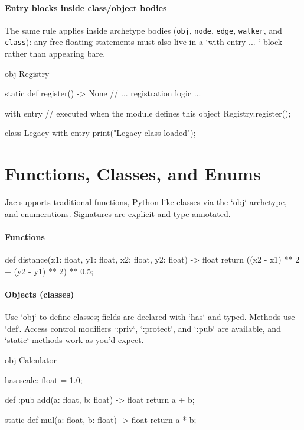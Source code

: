 \paragraph{Entry blocks inside class/object bodies}

The same rule applies inside archetype bodies (\texttt{obj}, \texttt{node}, \texttt{edge}, \texttt{walker}, and \texttt{class}): any free-floating statements must also live in a `with entry { ... }` block rather than appearing bare.

\begin{jacblock}
obj Registry {
    static def register() -> None {
        // ... registration logic ...
    }

    with entry {
        // executed when the module defines this object
        Registry.register();
    }
}

class Legacy {
    with entry {
        print("Legacy class loaded");
    }
}
\end{jacblock}

\section{Functions, Classes, and Enums}

Jac supports traditional functions, Python-like classes via the `obj` archetype, and enumerations. Signatures are explicit and type-annotated.

\paragraph{Functions}

\begin{jacblock}
def distance(x1: float, y1: float, x2: float, y2: float) -> float {
    return ((x2 - x1) ** 2 + (y2 - y1) ** 2) ** 0.5;
}
\end{jacblock}

\paragraph{Objects (classes)}

Use `obj` to define classes; fields are declared with `has` and typed. Methods use `def`. Access control modifiers `:priv`, `:protect`, and `:pub` are available, and `static` methods work as you'd expect.

\begin{jacblock}
obj Calculator {
    has scale: float = 1.0;

    def :pub add(a: float, b: float) -> float {
        return a + b;
    }

    static def mul(a: float, b: float) -> float {
        return a * b;
    }
}
\end{jacblock}


